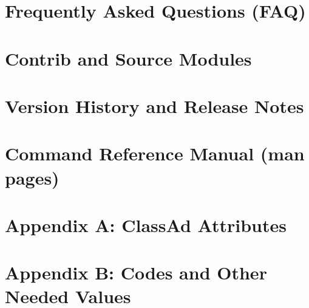 \documentclass[titlepage,oneside,latex2html,bookmarks,bookmarksnumbered,plainpages=false,pdfpagelabels]{book}
\begin{document}
\chapter{Frequently Asked Questions (FAQ)}
\label{sec:FAQ}


\chapter{Contrib and Source Modules}
\label{sec:Contrib}


\chapter{Version History and Release Notes}
\label{Version-History}


\chapter{Command Reference Manual (man pages)}
\label{sec:command-reference}


%
%
  \fancyhead[LE,RO]{\thepage}
  \fancyhead[RE]{\leftmark}
  \fancyhead[LO]{\rightmark}


\chapter{Appendix A:  ClassAd Attributes}
\label{sec:ClassAd-Attributes}

\chapter{Appendix B:  Codes and Other Needed Values}
\label{sec:Magic-Numbers}



\backmatter
{}
\label{index}
\printindex
\end{document}
